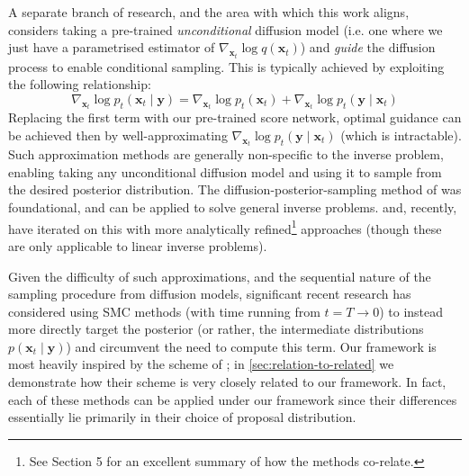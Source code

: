 A separate branch of research, and the area with which this work aligns, considers taking a pre-trained
\emph{unconditional} diffusion model (i.e. one where we just have a parametrised estimator of
$\nabla_{\mathbf{x}_t}\log q(\mathbf{x}_t)$) and \emph{guide} the diffusion process to enable
conditional sampling. This is typically achieved by exploiting the following relationship:
\begin{equation}
    \nabla_{\mathbf{x}_t} \log p_t(\mathbf{x}_t \mid \mathbf{y}) = \nabla_{\mathbf{x}_t} \log p_t(\mathbf{x}_t) + \nabla_{\mathbf{x}_t}\log p_t(\mathbf{y} \mid \mathbf{x}_t) \label{eq:cond-score}
\end{equation}
Replacing the first term with our pre-trained score network, optimal guidance can be achieved then
by well-approximating $\nabla_{\mathbf{x}_t}\log p_t(\mathbf{y} \mid \mathbf{x}_t)$ (which is
intractable). Such approximation methods are generally non-specific to the inverse problem, enabling
taking any unconditional diffusion model and using it to sample from the desired posterior
distribution. The diffusion-posterior-sampling method of
\textcite{chungDiffusionPosteriorSampling2022} was foundational, and can be applied to solve general
inverse problems. \textcite{song2023pseudoinverseguided} and, recently,
\textcite{boysTweedieMomentProjected2023} have iterated on this with more analytically
refined\footnote{See \cite{boysTweedieMomentProjected2023} Section 5 for an excellent summary
of how the methods co-relate.}
approaches (though these are only applicable to linear inverse problems).

Given the difficulty of such approximations, and the sequential nature of the sampling procedure
from diffusion models, significant recent research
\parencite{cardosoMonteCarloGuided2023,trippeDiffusionProbabilisticModeling2023,
wuPracticalAsymptoticallyExact2023,douDiffusionPosteriorSampling2023,
janatiDivideandConquerPosteriorSampling2024} has considered using SMC methods (with time running
from $t=T \to 0$) to instead more directly target the posterior (or rather, the intermediate
distributions $p(\mathbf{x}_t \mid \mathbf{y})$) and circumvent the need to compute this term. Our
framework is most heavily inspired by the scheme of \textcite{cardosoMonteCarloGuided2023}; in
\ref{sec:relation-to-related} we demonstrate how their scheme is very closely related to our
framework. In fact, each of these methods can be applied under our framework since their differences
essentially lie primarily in their choice of proposal distribution.

